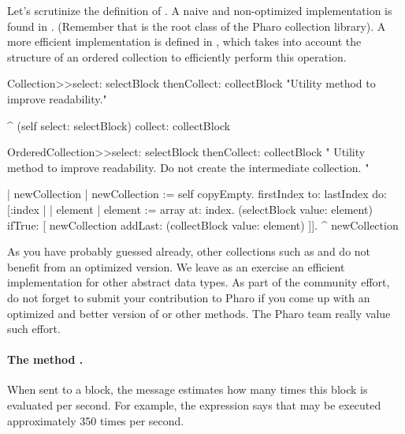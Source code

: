 \documentclass[a4paper,10pt,twoside]{book}
\begin{document}
Let's scrutinize the definition of . A naive and non-optimized implementation is found in . (Remember that  is the root class of the Pharo collection library). A more efficient implementation is defined in , which takes into account the structure of an ordered collection to efficiently perform this operation.

\begin{code}{}
Collection>>select: selectBlock thenCollect: collectBlock
	"Utility method to improve readability."

	^ (self select: selectBlock) collect: collectBlock
\end{code}
\begin{code}{}
OrderedCollection>>select: selectBlock thenCollect: collectBlock
    " Utility method to improve readability.
	Do not create the intermediate collection. "

	| newCollection |
    newCollection := self copyEmpty.
    firstIndex to: lastIndex do: [:index |
		| element |
		element := array at: index.
		(selectBlock value: element) 
			ifTrue: [ newCollection addLast: (collectBlock value: element) ]].
    ^ newCollection
\end{code}

As you have probably guessed already, other collections such as  and  do not benefit from an optimized version. We leave as an exercise an efficient implementation for other abstract data types. As part of the community effort, do not forget to submit your contribution to Pharo if you come up with an optimized and better version of  or other methods. The Pharo team really value such effort.


\paragraph{The method .} When sent to a block, the  message estimates how many times this block is evaluated per second. For example, the expression  says that  may be executed approximately 350 times per second.
\end{document}
